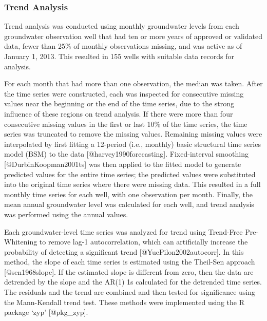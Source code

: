 \documentclass[
]{article}
\begin{document}
\vspace{30pt}

\newpage


\hypertarget{trend-analysis}{%
\subsubsection{Trend Analysis}\label{trend-analysis}}

Trend analysis was conducted using monthly groundwater levels from each
groundwater observation well that had ten or more years of approved or
validated data, fewer than 25\% of monthly observations missing, and was
active as of January 1, 2013. This resulted in 155 wells with suitable
data records for analysis.

For each month that had more than one observation, the median was taken.
After the time series were constructed, each was inspected for
consecutive missing values near the beginning or the end of the time
series, due to the strong influence of these regions on trend analysis.
If there were more than four consecutive missing values in the first or
last 10\% of the time series, the time series was truncated to remove
the missing values. Remaining missing values were interpolated by first
fitting a 12-period (i.e., monthly) basic structural time series model
(BSM) to the data {[}@harvey1990forecasting{]}. Fixed-interval smoothing
{[}@DurbinKoopman2001ts{]} was then applied to the fitted model to
generate predicted values for the entire time series; the predicted
values were substituted into the original time series where there were
missing data. This resulted in a full monthly time series for each well,
with one observation per month. Finally, the mean annual groundwater
level was calculated for each well, and trend analysis was performed
using the annual values.

Each groundwater-level time series was analyzed for trend using
Trend-Free Pre-Whitening to remove lag-1 autocorrelation, which can
artificially increase the probability of detecting a significant trend
{[}@YuePilon2002autocorr{]}. In this method, the slope of each time
series is estimated using the Theil-Sen approach {[}@sen1968slope{]}. If
the estimated slope is different from zero, then the data are detrended
by the slope and the AR(1) 1s calculated for the detrended time series.
The residuals and the trend are combined and then tested for
significance using the Mann-Kendall trend test. These methods were
implemented using the R package `zyp' {[}@pkg\_zyp{]}.
\end{document}
